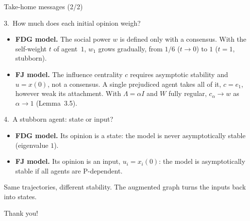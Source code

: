 \documentclass[10pt, aspectratio=169]{beamer}
\newcommand{\compactblocks}{\setbeamerfont{block title}{size=\small}}
\begin{document}
\begin{frame}[label=m-messages2]{Take-home messages (2/2)}
  \compactblocks
  \begin{alertblock}{3.\ How much does each initial opinion weigh?}
    \small
    \begin{itemize}\setlength{\itemsep}{1pt}
      \item \textbf{FDG model.} The social power $w$ is defined only with a consensus. With
            the self-weight $t$ of agent~$1$, $w_1$ grows gradually, from $1/6$ ($t \to 0$)
            to $1$ ($t = 1$, stubborn).
      \item \textbf{FJ model.} The influence centrality $c$ requires asymptotic stability
            and $u = x(0)$, not a consensus. A single prejudiced agent takes all of it,
            $c = e_1$, however weak its attachment. With $\Lambda = \alpha I$ and $W$ fully
            regular, $c_\alpha \to w$ as $\alpha \to 1$ (Lemma~3.5).
    \end{itemize}
  \end{alertblock}
  \begin{alertblock}{4.\ A stubborn agent: state or input?}
    \small
    \begin{itemize}\setlength{\itemsep}{1pt}
      \item \textbf{FDG model.} Its opinion is a state: the model is never asymptotically
            stable (eigenvalue $1$).
      \item \textbf{FJ model.} Its opinion is an input, $u_i = x_i(0)$: the model is
            asymptotically stable if all agents are P-dependent.
    \end{itemize}
    Same trajectories, different stability. The augmented graph turns the inputs back into
    states.
  \end{alertblock}
\end{frame}

\begin{emptyframe}
  Thank you!
\end{emptyframe}

\appendix


\end{document}
